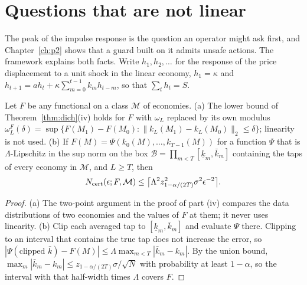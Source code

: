 \section{Questions that are not linear}\label{sec:nonlinear}

The peak of the impulse response is the question an operator might ask first, and Chapter~\ref{ch:p2} shows that a guard built on it admits unsafe actions. The framework explains both facts. Write $h_1,h_2,\dots$ for the response of the price displacement to a unit shock in the linear economy, $h_1=\kappa$ and $h_{t+1}=ah_t+\kappa\sum_{m=0}^{t-1}k_mh_{t-m}$, so that $\sum_th_t=S$.

\begin{proposition}\label{prop:nonlinear}
Let $F$ be any functional on a class $\mathcal M$ of economies. (a) The lower bound of Theorem~\ref{thm:dich}(iv) holds for $F$ with $\omega_L$ replaced by its own modulus $\omega^F_L(\delta)=\sup\{F(M_1)-F(M_0):\|k_L(M_1)-k_L(M_0)\|_2\le\delta\}$; linearity is not used. (b) If $F(M)=\Psi(k_0(M),\dots,k_{T-1}(M))$ for a function $\Psi$ that is $\Lambda$-Lipschitz in the sup norm on the box $\mathcal B=\prod_{m<T}[\underline k_m,\bar k_m]$ containing the taps of every economy in $\mathcal M$, and $L\ge T$, then
\[
N_{\rm cert}(\epsilon;F,\mathcal M)\le\bigl\lceil\Lambda^2z_{1-\alpha/(2T)}^2\sigma^2\epsilon^{-2}\bigr\rceil .
\]
\hfill\Proved
\end{proposition}

\begin{proof}
(a) The two-point argument in the proof of part (iv) compares the data distributions of two economies and the values of $F$ at them; it never uses linearity. (b) Clip each averaged tap to $[\underline k_m,\bar k_m]$ and evaluate $\Psi$ there. Clipping to an interval that contains the true tap does not increase the error, so $|\Psi(\text{clipped }\bar k)-F(M)|\le\Lambda\max_{m<T}|\bar k_m-k_m|$. By the union bound, $\max_m|\bar k_m-k_m|\le z_{1-\alpha/(2T)}\sigma/\sqrt N$ with probability at least $1-\alpha$, so the interval with that half-width times $\Lambda$ covers $F$.
\end{proof}

